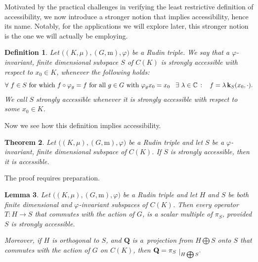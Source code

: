 \documentclass[12pt]{amsart}
\numberwithin{subsection}{section}
\newtheorem{theorem}{Theorem}[section]
\newtheorem{lemma}[theorem]{Lemma}
\newtheorem{definition}[theorem]{Definition}
\theoremstyle{definition}
\theoremstyle{remark}
\newcommand\restrict[1]{\raisebox{-.5ex}{ $\vert $}_{#1}}
\begin{document}
\smallskip


Motivated by the practical challenges in verifying the least restrictive definition of accessibility, we now introduce a stronger notion that implies accessibility, hence its name.  Notably, for the applications we will explore later, this stronger notion is the one we will actually be employing.
\smallskip


\begin{definition}\label{strongaccesibility}
Let $\big((K,\mu),
(G, \mathrm{m}),\varphi\big)$ be a Rudin triple.
We say that a  $\varphi$-invariant, finite dimensional subspace $S$ of  $C(K)$ is  strongly accessible with respect to $x_0 \in K$, whenever  the following holds:
  \begin{equation}\label{point}
    \text{$\forall$    $f \in S$ for which $f \circ \varphi_g = f$ for all $g \in G$ with $\varphi_g x_0 = x_0$
    \, $\exists$ $\lambda \in \mathbb{C}$  $\colon$ \,   $f = \lambda \,\mathbf{k}_{S}(x_0, \cdot) $.}
  \end{equation}
  We call $S$  strongly accessible whenever it is strongly accessible with respect to some  $x_0 \in K$.
\end{definition}



Now we see how this definition implies accessibility.






\begin{theorem} \label{ac-strongacB}
Let $\big((K,\mu),(G,\mathrm{m}),\varphi\big)$ be a Rudin triple and let $S$ be a $\varphi$-invariant, finite dimensional subspace of  $C(K)$.
  If $S$ is strongly accessible, then it is accessible.
\end{theorem}



The proof requires  preparation.


\begin{lemma}\label{ac-lemmaB}
Let $\big((K,\mu),(G,\mathrm{m}),\varphi\big)$ be a Rudin triple and let $H$ and $S$ be both finite dimensional and $\varphi$-invariant subspaces of $C(K)$.
Then  every operator $T\colon H\to  S$ that commutes with the action of $G$, is a scalar multiple of   $\pi_S$, provided $S$ is strongly accessible.

Moreover, if $H$ is  orthogonal to $S$, and $\mathbf{Q}$ is  
a~projection from $H \bigoplus S$ onto $S$ that commutes with the action of
$G$
on $C(K)$,  then $\mathbf{Q}=\pi_{S}\restrict{H \bigoplus S}.$
\end{lemma}
\end{document}

